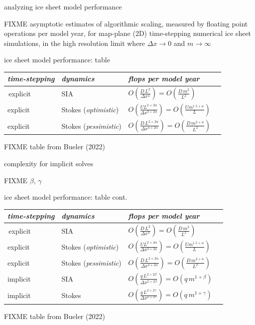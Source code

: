 \documentclass[svgnames,
               hyperref={colorlinks,citecolor=DeepPink4,linkcolor=FireBrick,urlcolor=Maroon},
               usepdftitle=false]  %
               {beamer}
\newcommand{\oo}[1]{\displaystyle O\left(#1\right)}
\begin{document}
\begin{frame}{analyzing ice sheet model performance}

FIXME asymptotic estimates of algorithmic scaling, measured by floating point operations per model year, for map-plane (2D) time-stepping numerical ice sheet simulations, in the high resolution limit where $\Delta x\to 0$ and $m\to\infty$
\end{frame}

\begin{frame}{ice sheet model performance: table}

\begin{tabular}{llll}
\emph{time-stepping} & \emph{dynamics} & \emph{flops per model year} \\ \hline
\,explicit & SIA    & $\oo{\frac{D\, L^2}{\Delta x^4}} = \oo{\frac{D\, m^2}{L^2}}$ \\
explicit & Stokes (\emph{optimistic}) & $\oo{\frac{U L^{2+2\alpha}}{\Delta x^{3+2\alpha}}} = \oo{\frac{U m^{1.5+\alpha}}{L}}$ \\
explicit & Stokes (\emph{pessimistic})  & $\oo{\frac{D\, L^{2+2\alpha}}{\Delta x^{4+2\alpha}}} = \oo{\frac{D\,m^{2+\alpha}}{L^2}}$
\end{tabular}

FIXME table from Bueler (2022)
\end{frame}


\begin{frame}{complexity for implicit solves}

FIXME $\beta$, $\gamma$
\end{frame}


\begin{frame}{ice sheet model performance: table cont.}

\begin{tabular}{llll}
\emph{time-stepping} & \emph{dynamics} & \emph{flops per model year} \\ \hline
\,explicit & SIA    & $\oo{\frac{D\, L^2}{\Delta x^4}} = \oo{\frac{D\, m^2}{L^2}}$ \\
explicit & Stokes (\emph{optimistic}) & $\oo{\frac{U L^{2+2\alpha}}{\Delta x^{3+2\alpha}}} = \oo{\frac{U m^{1.5+\alpha}}{L}}$ \\
explicit & Stokes (\emph{pessimistic})  & $\oo{\frac{D\, L^{2+2\alpha}}{\Delta x^{4+2\alpha}}} = \oo{\frac{D\,m^{2+\alpha}}{L^2}}$ \\
implicit & SIA    & $\oo{\frac{q\, L^{2+2\beta}}{\Delta x^{2+2\beta}}} = \oo{q\, m^{1+\beta}}$ \\
implicit & Stokes & $\oo{\frac{q\, L^{2+2\gamma}}{\Delta x^{2+2\gamma}}} = \oo{q\, m^{1+\gamma}}$
\end{tabular}

FIXME table from Bueler (2022)
\end{frame}
\end{document}
